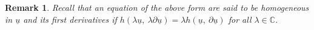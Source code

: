 \documentclass[10pt,a4paper]{article}
\theoremstyle{plain}
\newtheorem{remark}{Remark}
\begin{document}
\begin{remark}
\emph{ Recall that an equation of the
above form are said to be \textit{homogeneous in} $\underline{u}$
\textit{and its first derivatives} if
$h\left(\lambda\underline{u},~\lambda\partial\underline{u}\right)=\lambda
h\left(\underline{u},~\partial\underline{u}\right)$ for all
$\lambda\in\mathbb{C}$. }
\end{remark}





\end{document}
